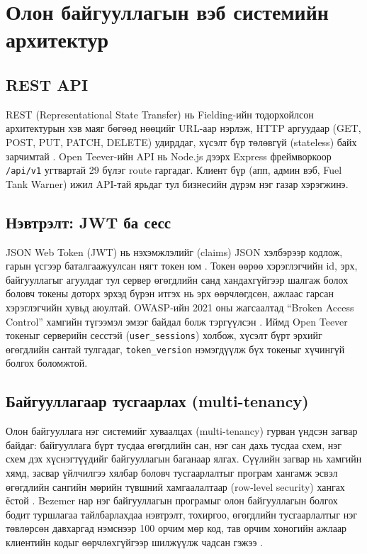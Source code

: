 \documentclass[
12pt,
oneside,
english,
onehalfspacing,
nolistspacing,
headsepline,
]{MUST-Thesis}
\begin{document}
\section{Олон байгууллагын вэб системийн архитектур}

\subsection{REST API}

REST (Representational State Transfer) нь Fielding-ийн тодорхойлсон архитектурын хэв маяг бөгөөд нөөцийг URL-аар нэрлэж, HTTP аргуудаар (GET, POST, PUT, PATCH, DELETE) удирддаг, хүсэлт бүр төлөвгүй (stateless) байх зарчимтай \cite{fielding2000rest}. Open Teever-ийн API нь Node.js дээрх Express фреймворкоор \cite{expressdocs} \texttt{/api/v1} угтвартай 29 бүлэг route гаргадаг. Клиент бүр (апп, админ вэб, Fuel Tank Warner) ижил API-тай ярьдаг тул бизнесийн дүрэм нэг газар хэрэгжинэ.

\subsection{Нэвтрэлт: JWT ба сесс}

JSON Web Token (JWT) нь нэхэмжлэлийг (claims) JSON хэлбэрээр кодлож, гарын үсгээр баталгаажуулсан нягт токен юм \cite{rfc7519}. Токен өөрөө хэрэглэгчийн id, эрх, байгууллагыг агуулдаг тул сервер өгөгдлийн санд хандахгүйгээр шалгаж болох боловч токены доторх эрхэд бүрэн итгэх нь эрх өөрчлөгдсөн, ажлаас гарсан хэрэглэгчийн хувьд аюултай. OWASP-ийн 2021 оны жагсаалтад ``Broken Access Control'' хамгийн түгээмэл эмзэг байдал болж тэргүүлсэн \cite{owasp2021a01}. Иймд Open Teever токеныг серверийн сесстэй (\texttt{user\_sessions}) холбож, хүсэлт бүрт эрхийг өгөгдлийн сантай тулгадаг, \texttt{token\_version} нэмэгдүүлж бүх токеныг хүчингүй болгох боломжтой.

\subsection{Байгууллагаар тусгаарлах (multi-tenancy)}

Олон байгууллага нэг системийг хуваалцах (multi-tenancy) гурван үндсэн загвар байдаг: байгууллага бүрт тусдаа өгөгдлийн сан, нэг сан дахь тусдаа схем, нэг схем дэх хүснэгтүүдийг байгууллагын баганаар ялгах. Сүүлийн загвар нь хамгийн хямд, засвар үйлчилгээ хялбар боловч тусгаарлалтыг програм хангамж эсвэл өгөгдлийн сангийн мөрийн түвшний хамгаалалтаар (row-level security) хангах ёстой \cite{guo2007multitenant}. Bezemer нар нэг байгууллагын програмыг олон байгууллагын болгох бодит туршлагаа тайлбарлахдаа нэвтрэлт, тохиргоо, өгөгдлийн тусгаарлалтыг нэг төвлөрсөн давхаргад нэмснээр 100 орчим мөр код, тав орчим хоногийн ажлаар клиентийн кодыг өөрчлөхгүйгээр шилжүүлж чадсан гэжээ \cite{bezemer2010multitenancy}.
\end{document}
